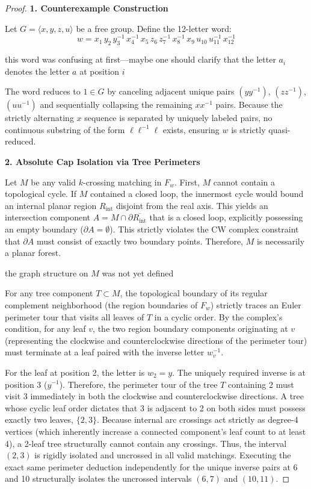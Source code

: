 \documentclass[12pt]{article}
\newcommand{\review}[1]{\begin{reviewbox}#1\end{reviewbox}}
\begin{document}
\begin{proof}
\textbf{1. Counterexample Construction}

Let $G = \langle x, y, z, u \rangle$ be a free group. Define the 12-letter word:
\[
w = x_1\, y_2\, y_3^{-1}\, x_4^{-1}\, x_5\, z_6\, z_7^{-1}\, x_8^{-1}\, x_9\, u_{10}\, u_{11}^{-1}\, x_{12}^{-1}
\]
\review{this word was confusing at first---maybe one should clarify that the letter $a_i$ denotes the letter $a$ at position $i$}
The word reduces to $1 \in G$ by canceling adjacent unique pairs $(y y^{-1})$, $(z z^{-1})$, $(u u^{-1})$ and sequentially collapsing the remaining $x x^{-1}$ pairs. Because the strictly alternating $x$ sequence is separated by uniquely labeled pairs, no continuous substring of the form $\ell \ell^{-1} \ell$ exists, ensuring $w$ is strictly quasi-reduced.

\vspace{1em}
\noindent\textbf{2. Absolute Cap Isolation via Tree Perimeters}

Let $M$ be any valid $k$-crossing matching in $F_w$. First, $M$ cannot contain a topological cycle. If $M$ contained a closed loop, the innermost cycle would bound an internal planar region $R_{\text{int}}$ disjoint from the real axis. This yields an intersection component $A = M \cap \partial \overline{R_{\text{int}}}$ that is a closed loop, explicitly possessing an empty boundary ($\partial A = \emptyset$). This strictly violates the CW complex constraint that $\partial A$ must consist of exactly two boundary points. Therefore, $M$ is necessarily a planar forest.\review{the graph structure on $M$ was not yet defined}

For any tree component $T \subset M$, the topological boundary of its regular complement neighborhood (the region boundaries of $F_w$) strictly traces an Euler perimeter tour that visits all leaves of $T$ in a cyclic order. By the complex's condition, for any leaf $v$, the two region boundary components originating at $v$ (representing the clockwise and counterclockwise directions of the perimeter tour) must terminate at a leaf paired with the inverse letter $w_v^{-1}$.

For the leaf at position 2, the letter is $w_2 = y$. The uniquely required inverse is at position 3 ($y^{-1}$). Therefore, the perimeter tour of the tree $T$ containing 2 must visit 3 immediately in both the clockwise and counterclockwise directions. A tree whose cyclic leaf order dictates that 3 is adjacent to 2 on both sides must possess exactly two leaves, $\{2,3\}$. Because internal arc crossings act strictly as degree-4 vertices (which inherently increase a connected component's leaf count to at least 4), a 2-leaf tree structurally cannot contain any crossings. Thus, the interval $(2,3)$ is rigidly isolated and uncrossed in all valid matchings. Executing the exact same perimeter deduction independently for the unique inverse pairs at 6 and 10 structurally isolates the uncrossed intervals $(6,7)$ and $(10,11)$.


\end{proof}
\end{document}
